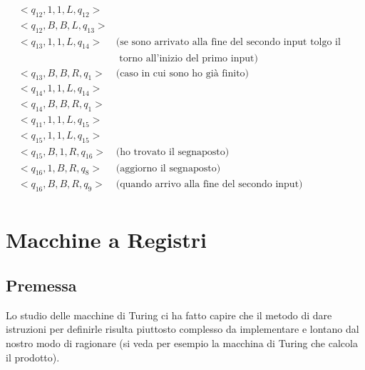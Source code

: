 \begin{esempio}[Prodotto]
\begin{eqnarray*}
&<q_{12},1,1,L,q_{12}>&\\
&<q_{12},B,B,L,q_{13}>&\\
&<q_{13},1,1,L,q_{14}>&\mbox{(se sono arrivato alla fine del secondo input tolgo il segnaposto e}\\
&&\mbox{ torno all'inizio del primo input)}\\
&<q_{13},B,B,R,q_{1}>&\mbox{(caso in cui sono ho gi\`a finito)}\\
&<q_{14},1,1,L,q_{14}>&\\
&<q_{14},B,B,R,q_{1}>&\\
&<q_{11},1,1,L,q_{15}>&\\
&<q_{15},1,1,L,q_{15}>&\\
&<q_{15},B,1,R,q_{16}>&\mbox{(ho trovato il segnaposto)}\\
&<q_{16},1,B,R,q_{8}>&\mbox{(aggiorno il segnaposto)}\\
&<q_{16},B,B,R,q_{9}>&\mbox{(quando arrivo alla fine del secondo input) }\\
\end{eqnarray*}
\end{esempio}


\chapter{Macchine a Registri}


\section{Premessa}
Lo studio delle macchine di Turing ci ha fatto capire che il metodo di
dare istruzioni per definirle risulta piuttosto complesso da
implementare e lontano dal nostro modo di ragionare (si veda per
esempio la macchina di Turing che calcola il prodotto).

